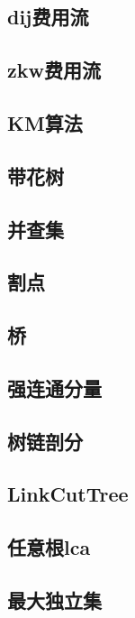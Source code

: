 \documentclass[10pt,a4paper]{article}
\begin{document}
\subsection{dij费用流}

\subsection{zkw费用流}

\subsection{KM算法}

\subsection{带花树}

\subsection{并查集}

\subsection{割点}

\subsection{桥}

\subsection{强连通分量}

\subsection{树链剖分}

\subsection{LinkCutTree}

\subsection{任意根lca}

\subsection{最大独立集}

\end{document}
